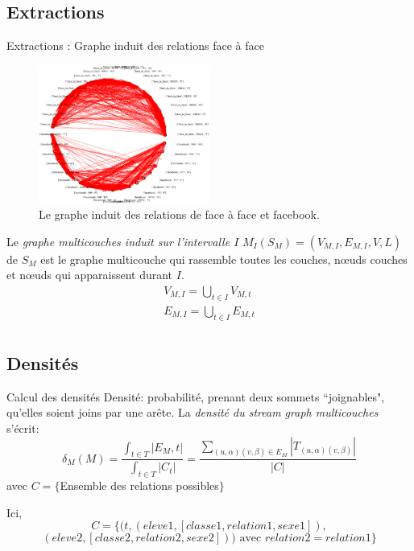 \documentclass[15pt]{beamer}
\def \stgm {stream graph multicouches}
\begin{document}
\subsection{Extractions}
\begin{frame}{Extractions : Graphe induit des relations face à face}

\begin{figure}
    \centering
    \includegraphics[width=0.5\textwidth]{img/tout.png}
    \caption{Le graphe induit des relations de face à face et facebook.}
    \label{fig:my_label}
\end{figure}
    Le {\em graphe multicouches induit sur l'intervalle $I$} $M_I(S_M) = (V_{M,I}, E_{M,I}, V,L)$ de $S_M$ est le graphe multicouche qui rassemble toutes les couches, n\oe{}uds couches et n\oe{}uds qui apparaissent durant $I$.
    \begin{align*}
    	V_{M,I} = \bigcup_{t\in I} V_{M,t}\\
    	E_{M,I} = \bigcup_{t\in I} E_{M,t}\\
    \end{align*}
\end{frame}

\subsection{Densités}

\begin{frame}{Calcul des densités}
    Densité: probabilité, prenant deux sommets ``joignables", qu'elles soient joins par une arête.
    La {\em densité du \stgm{}} s'écrit: 
	\[
		\delta_M (M) 
		= \frac{\int_{t\in T}|E_M,t|}{\int_{t\in T}|C_t|} 
		= \frac{\sum_{(u,\alpha)(v,\beta) \in E_M}|T_{(u,\alpha)(v,\beta)}|}{|C|}
	\]	
	avec $C=\{$Ensemble des relations possibles$\}$
    
    Ici, $$C=\{(t,(eleve1,[classe1,relation1,sexe1]),$$ $$(eleve2,[classe2,relation2,sexe2])) \text{ avec } relation2=relation1\}$$
\end{frame}
\end{document}
